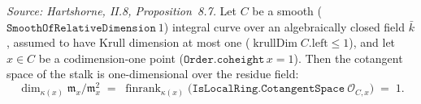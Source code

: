 \begin{lemma}

  \label{lem:cotangentSpace_finrank_eq_one_of_smooth}
  \textit{Source: Hartshorne, II.8, Proposition~8.7.}
  Let \(C\) be a smooth (\(\texttt{SmoothOfRelativeDimension}\ 1\)) integral
  curve over an algebraically closed field \(\bar k\), assumed to have Krull
  dimension at most one (\(\operatorname{krullDim} C.\mathrm{left} \le 1\)), and
  let \(x \in C\) be a codimension-one point (\(\texttt{Order.coheight}\,x = 1\)).
  Then the cotangent space of the stalk is one-dimensional over the residue
  field:
  \[
    \dim_{\kappa(x)} \mathfrak m_x / \mathfrak m_x^2
    \;=\;
    \operatorname{finrank}_{\kappa(x)}
      \bigl(\texttt{IsLocalRing.CotangentSpace}\ \mathcal O_{C, x}\bigr)
    \;=\; 1.
  \]
\end{lemma}

